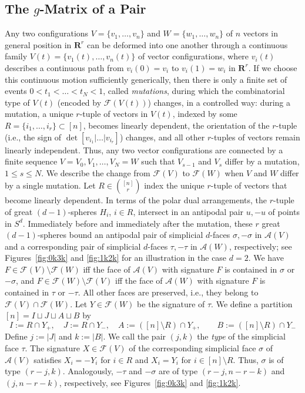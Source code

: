\documentclass[11pt]{article}
\newcommand{\arr}{\mathcal{A}}
\renewcommand{\leq}{\leqslant}
\newcommand{\R}{\mathbf{R}}
\begin{document}
\subsection{The $g$-Matrix of a Pair}
\label{sec:g-pair}
%
Any two configurations $V=\{v_1,\dots,v_n\}$ and $W=\{w_1,\dots,w_n\}$ of $n$ vectors in general position in $\R^r$ can be deformed into one another through a continuous family $V(t)=\{v_1(t),\dots,v_n(t)\}$ of vector configurations, where $v_i(t)$ describes a continuous path from $v_i(0)=v_i$ to $v_i(1)=w_i$ in $\R^r$. If we choose this continuous motion sufficiently generically, then there is only a finite set of events $0 < t_1 < \dots < t_N < 1$, called \emph{mutations}, during which the combinatorial type of $V(t)$ (encoded by $\mathcal{F}(V(t))$) changes, 
in a controlled way: during a mutation, a unique $r$-tuple of vectors in $V(t)$, indexed by some $R=\{i_1,\dots,i_r\} \subset [n]$, becomes linearly dependent, the orientation of the $r$-tuple (i.e., the sign of 
$\det[v_{i_1}|\dots | v_{i_r}]$) changes, and all other $r$-tuples of vectors remain linearly independent. Thus, any two vector configurations are connected by a finite sequence $V=V_0,V_1,\dots,V_N=W$ such that $V_{s-1}$ and $V_s$ differ by a mutation, $1\leq s\leq N$. 
We describe the change from $\mathcal{F}(V)$ to $\mathcal{F}(W)$ when $V$ and $W$ differ by a single mutation. Let $R\in \binom{[n]}{r}$ index the unique $r$-tuple of vectors that become linearly dependent. In terms of the polar dual arrangements, the $r$-tuple of great $(d-1)$-spheres $H_i$, $i\in R$, intersect in an antipodal pair $u,-u$ of points in $S^d$. Immediately before and immediately after the mutation, these $r$ great $(d-1)$-spheres bound an antipodal pair of simplicial $d$-faces $\sigma,-\sigma$ in $\mathcal{A}(V)$ and a corresponding pair of simplicial $d$-faces $\tau,-\tau$ in $\mathcal{A}(W)$, respectively; see Figures~\ref{fig:0k3k} and \ref{fig:1k2k} for an illustration in the case $d=2$. We have $F\in \mathcal{F}(V)\setminus \mathcal{F}(W)$ iff the face of $\arr(V)$ with signature $F$ is contained in $\sigma$ or $-\sigma$, and $F\in \mathcal{F}(W)\setminus \mathcal{F}(V)$ iff the face of $\arr(W)$  with signature $F$ is contained in $\tau$ or $-\tau$. All other faces are preserved, i.e., they belong to $\mathcal{F}(V) \cap \mathcal{F}(W)$. 
%
Let $Y\in \mathcal{F}(W)$ be the signature of $\tau$. We define a partition $[n] = I \sqcup J \sqcup A \sqcup B$ by 
\[I:=R \cap Y_+, \quad J:=R \cap Y_-, \quad A:=([n]\setminus R) \cap Y_+ ,\qquad B:=([n]\setminus R) \cap Y_-\]
Define $j:=|J|$ and $k:=|B|$. We call the pair $(j,k)$ the \emph{type} of the simplicial face $\tau$. The signature $X\in \mathcal{F}(V)$ of the corresponding simplicial face $\sigma$ of $\arr(V)$ satisfies $X_i = -Y_i$ for $i \in R$ and $X_i = Y_i$ for $i\in [n]\setminus R$. Thus, $\sigma$ is of type $(r-j,k)$. Analogously, $-\tau$ and $-\sigma$ are of type $(r-j,n-r-k)$ and $(j,n-r-k)$, respectively, see Figures~\ref{fig:0k3k} and \ref{fig:1k2k}. 
\end{document}

